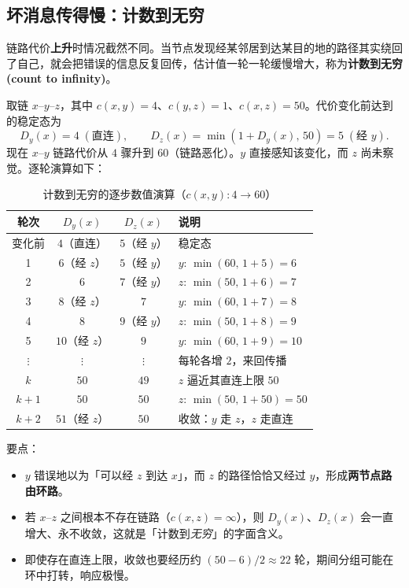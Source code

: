 \subsection{坏消息传得慢：计数到无穷}

链路代价\textbf{上升}时情况截然不同。当节点发现经某邻居到达某目的地的路径其实绕回了自己，就会把错误的信息反复回传，估计值一轮一轮缓慢增大，称为\textbf{计数到无穷 (count to infinity)}。

取链 $x$--$y$--$z$，其中 $c(x,y)=4$、$c(y,z)=1$、$c(x,z)=50$。代价变化前达到的稳定态为
\begin{equation}
    D_y(x)=4 \;(\text{直连}), \qquad D_z(x)=\min(1+D_y(x),\,50)=5 \;(\text{经 }y).
\end{equation}
现在 $x$--$y$ 链路代价从 $4$ 骤升到 $60$（链路恶化）。$y$ 直接感知该变化，而 $z$ 尚未察觉。逐轮演算如下：

\begin{table}[H]
\centering
\caption{计数到无穷的逐步数值演算（$c(x,y):4\to 60$）}
\renewcommand{\arraystretch}{1.3}
\begin{tabulary}{\textwidth}{@{}c|C|C|L@{}}
\toprule
\textbf{轮次} & \textbf{$D_y(x)$} & \textbf{$D_z(x)$} & \textbf{说明} \\
\midrule
变化前 & $4$（直连） & $5$（经 $y$） & 稳定态 \\
1 & $6$（经 $z$） & $5$（经 $y$） & $y$: $\min(60,\,1+5)=6$ \\
2 & $6$ & $7$（经 $y$） & $z$: $\min(50,\,1+6)=7$ \\
3 & $8$（经 $z$） & $7$ & $y$: $\min(60,\,1+7)=8$ \\
4 & $8$ & $9$（经 $y$） & $z$: $\min(50,\,1+8)=9$ \\
5 & $10$（经 $z$） & $9$ & $y$: $\min(60,\,1+9)=10$ \\
$\vdots$ & $\vdots$ & $\vdots$ & 每轮各增 $2$，来回传播 \\
$k$ & $50$ & $49$ & $z$ 逼近其直连上限 $50$ \\
$k{+}1$ & $50$ & $50$ & $z$: $\min(50,\,1+50)=50$ \\
$k{+}2$ & $51$（经 $z$） & $50$ & 收敛：$y$ 走 $z$，$z$ 走直连 \\
\bottomrule
\end{tabulary}
\end{table}

要点：
\begin{itemize}
    \item $y$ 错误地以为「可以经 $z$ 到达 $x$」，而 $z$ 的路径恰恰又经过 $y$，形成\textbf{两节点路由环路}。
    \item 若 $x$--$z$ 之间根本不存在链路（$c(x,z)=\infty$），则 $D_y(x)$、$D_z(x)$ 会一直增大、永不收敛，这就是「计数到\emph{无穷}」的字面含义。
    \item 即使存在直连上限，收敛也要经历约 $(50-6)/2\approx 22$ 轮，期间分组可能在环中打转，响应极慢。
\end{itemize}


